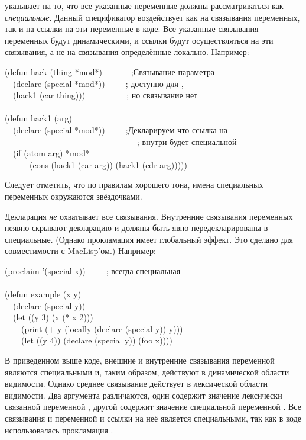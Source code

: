 \begin{flushdesc}

\item[\cdf{special}]
 указывает на то, что все указанные
переменные должны рассматриваться как \emph{специальные}.
Данный спецификатор воздействует как на связывания переменных, так и на ссылки
на эти переменные в коде.
Все указанные связывания переменных будут динамическими, и ссылки будут
осуществляться на эти связывания, а не на связывания определённые локально.
Например:
\begin{lisp}
(defun hack (thing *mod*)~~~~~~~;\textrm{Связывание параметра} \\
~~(declare (special *mod*))~~~~~; \textrm{ доступно для ,} \\
~~(hack1 (car thing)))~~~~~~~~~~; \textrm{но связывание  нет} \\
 \\
(defun hack1 (arg) \\
~~(declare (special *mod*))~~~~~;\textrm{Декларируем что ссылка на } \\
~~~~~~~~~~~~~~~~~~~~~~~~~~~~~~~~; \textrm{внутри  будет специальной} \\
~~(if (atom arg) *mod* \\
~~~~~~(cons (hack1 (car arg)) (hack1 (cdr arg)))))
\end{lisp}
Следует отметить, что по правилам хорошего тона, имена специальных переменных
окружаются звёздочками.

Декларация  \emph{не} охватывает все связывания.
Внутренние связывания переменных неявно скрывают декларацию  и
должны быть явно передекларированы в специальные.
(Однако прокламация  имеет глобальный эффект. Это сделано для
совместимости с MacLisp'ом.)
Например:
\begin{lisp}
(proclaim '(special x))~~~~~;\textrm{ всегда специальная} \\
 \\
(defun example (x y) \\
~~(declare (special y)) \\
~~(let ((y 3) (x (* x 2))) \\
~~~~(print (+ y (locally (declare (special y)) y))) \\
~~~~(let ((y 4)) (declare (special y)) (foo x))))
\end{lisp}
В приведенном выше коде, внешние и внутренние связывания переменной 
являются специальными и, таким образом, действуют в динамической области
видимости. Однако среднее связывание действует в лексической области
видимости. Два аргумента \cdf{+} различаются, один содержит значение 
лексически связанной переменной , другой содержит значение специальной
переменной .
Все связывания и переменной  и ссылки на неё является специальными,
так как в коде использовалась прокламация .


\end{flushdesc}
